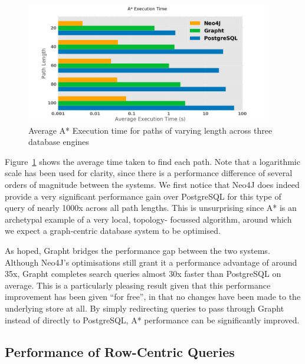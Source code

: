 \begin{figure}[htbp]
	\centering
	\includegraphics[width=0.95\textwidth]{figs/astargraph.eps}
	\caption{Average A* Execution time for paths of varying length across three database engines}
	\label{fig:astargraph}
\end{figure}

Figure~\ref{fig:astargraph} shows the average time taken to find each path.
Note that a logarithmic scale has been used for clarity, since there is a
performance difference of several orders of magnitude between the systems. We
first notice that Neo4J does indeed provide a very significant performance
gain over PostgreSQL for this type of query of nearly 1000x across all path lengths. This is
unsurprising since A* is an archetypal example of a very local, topology-
focussed algorithm, around which we expect a graph-centric database system to
be optimised. 

As hoped, Grapht bridges the performance gap between the two systems. Although
Neo4J's optimisations still grant it a performance advantage of around 35x,
Grapht completes search queries almost 30x faster than PostgreSQL on average. 
This is a particularly pleasing result given that this performance improvement 
has been given ``for free'', in that no changes have been made to the underlying
store at all. By simply redirecting queries to pass through Grapht instead of
directly to PostgreSQL, A* performance can be significantly improved.


\subsection{Performance of Row-Centric Queries} %
\label{sub:performance_of_row_centric_queries}

